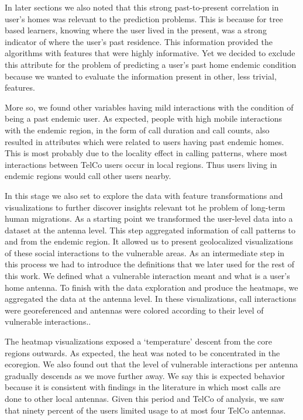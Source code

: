 In later sections we also noted that this strong past-to-present correlation in user's homes was relevant to the prediction problems.
This is because for tree based learners, knowing where the user lived in the present, was a strong indicator of where the user's past residence.
This information provided the algorithms with features that were highly informative.
Yet we decided to exclude this attribute for the problem of predicting a user's past home endemic condition because we wanted to evaluate the information present in other, less trivial, features.

More so, we found other variables having mild interactions with the condition of being a past endemic user.
As expected, people with high mobile interactions with the endemic region, in the form of call duration and call counts, also resulted in attributes which were related to users having past endemic homes.
This is most probably due to the locality effect in calling patterns, where most interactions between TelCo users occur in local regions.
Thus users living in endemic regions would call other users nearby.



In this stage we also set to explore the data with feature transformations and visualizations to further discover insights relevant tot he problem of long-term human migrations. %
As a starting point we transformed the user-level data into a dataset at the antenna level.
This step aggregated information of call patterns to and from the endemic region.
It allowed us to present geolocalized visualizations of these social interactions to the vulnerable areas.
As an intermediate step in this process we had to introduce the definitions that we later used for the rest of this work.
We defined what a vulnerable interaction meant and what is a user's home antenna.
To finish with the data exploration and produce the heatmaps, we aggregated the data at the antenna level.
In these visualizations, call interactions were georeferenced and antennas were colored according to their level of vulnerable interactions..

The heatmap visualizations exposed a `temperature' descent from the core regions outwards.
As expected, the heat was noted to be concentrated in the ecoregion.
We also found out that the level of vulnerable interactions per antenna gradually descends as we move further away.
We say this is expected behavior because it is consistent with findings in the literature in which most calls are done to other local antennas. %
Given this period and TelCo of analysis, we saw that ninety percent of the users limited usage to at most four TelCo antennas.

